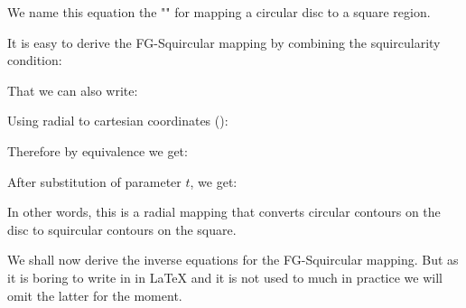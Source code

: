 	We name this equation the "" for mapping a circular disc to a square region.
	
	It is easy to derive the FG-Squircular mapping by combining the squircularity condition:
	
	That we can also write:
	
	Using radial to cartesian coordinates ():
	
	Therefore by equivalence we get:
	
	After substitution of parameter $t$, we get:
	

	In other words, this is a radial mapping that converts circular contours on the disc to squircular contours on the square.
	
	We shall now derive the inverse equations for the FG-Squircular mapping. But as it is boring to write in in \LaTeX{} and it is not used to much in practice we will omit the latter for the moment.
	
